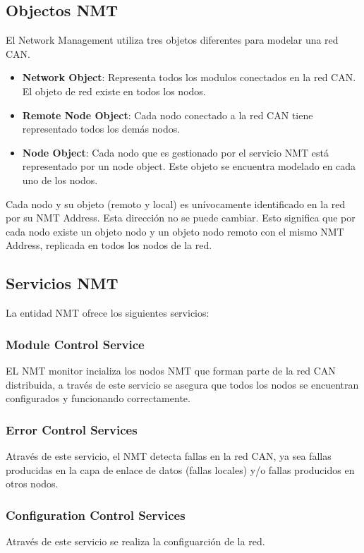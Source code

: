 \subsection{Objectos NMT}
El Network Management utiliza tres objetos diferentes para modelar una red CAN.
\begin{itemize}
 \item \textbf{Network Object}: Representa todos los modulos conectados en la
  red CAN. El objeto de red existe en todos los nodos.
 \item \textbf{Remote Node Object}: Cada nodo conectado a la red CAN tiene
   representado todos los demás nodos.    
 \item \textbf{Node Object}: Cada nodo que es gestionado por el servicio NMT
   está representado por un node object. Este objeto se encuentra modelado en
   cada uno de los nodos.    
 \end{itemize}
Cada nodo y su objeto (remoto y local) es unívocamente identificado en la red
por su NMT Address. Esta dirección no se puede cambiar. Esto significa que por
cada nodo existe un objeto nodo y un objeto nodo remoto con el mismo NMT
Address, replicada en todos los nodos de la red. 

\subsection{Servicios NMT}
La entidad NMT ofrece los siguientes servicios:
\subsubsection{Module Control Service}
EL NMT monitor incializa los nodos NMT que forman parte de la red CAN
distribuida, a través de este servicio se asegura que todos los nodos se
encuentran configurados y funcionando correctamente.
\subsubsection{Error Control Services}
Através de este servicio, el NMT detecta fallas en la red CAN, ya sea fallas
producidas en la capa de enlace de datos (fallas locales) y/o fallas
producidos en otros nodos.
\subsubsection{Configuration Control Services}
Através de este servicio se realiza la configuarción de la red.

